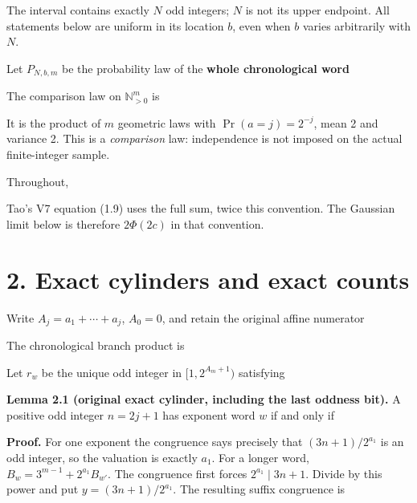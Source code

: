 The interval contains exactly \(N\) odd integers; \(N\) is not its upper
endpoint. All statements below are uniform in its location \(b\), even
when \(b\) varies arbitrarily with \(N\).

Let \(P_{N,b,m}\) be the probability law of the \textbf{whole
chronological word}


The comparison law on \(\mathbb N_{>0}^m\) is


It is the product of \(m\) geometric laws with \(\Pr(a=j)=2^{-j}\), mean
2 and variance 2. This is a \emph{comparison} law: independence is not
imposed on the actual finite-integer sample.

Throughout,


Tao's V7 equation (1.9) uses the full sum, twice this convention. The
Gaussian limit below is therefore \(2\Phi(2c)\) in that convention.

\section{2. Exact cylinders and exact counts}

Write \(A_j=a_1+\cdots+a_j\), \(A_0=0\), and retain the original affine
numerator


The chronological branch product is


Let \(r_w\) be the unique odd integer in \([1,2^{A_m+1})\) satisfying


\textbf{Lemma 2.1 (original exact cylinder, including the last oddness
bit).} A positive odd integer \(n=2j+1\) has exponent word \(w\) if and
only if


\textbf{Proof.} For one exponent the congruence says precisely that
\((3n+1)/2^{a_1}\) is an odd integer, so the valuation is exactly
\(a_1\). For a longer word, \(B_w=3^{m-1}+2^{a_1}B_{w'}\). The
congruence first forces \(2^{a_1}\mid 3n+1\). Divide by this power and
put \(y=(3n+1)/2^{a_1}\). The resulting suffix congruence is

